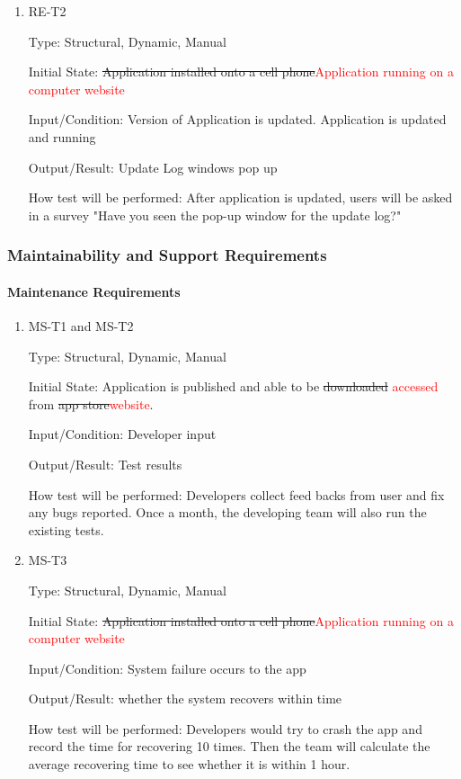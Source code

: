 \documentclass[12pt, titlepage]{article}
\begin{document}
\begin{enumerate}
					
\item{RE-T2\\}

Type: Structural, Dynamic, Manual
					
Initial State: \sout{Application installed onto a cell phone}\textcolor{red}{Application running on a computer website}
					
Input/Condition: Version of Application is updated. Application is updated and running
					
Output/Result: Update Log windows pop up
					
How test will be performed: After application is updated, users will be asked in a survey "Have you seen the pop-up window for the update log?" 

\end{enumerate}

\subsubsection{Maintainability and Support Requirements}
\paragraph{Maintenance Requirements}
\begin{enumerate}

\item{MS-T1 and MS-T2\\}

Type: Structural, Dynamic, Manual
					
Initial State: Application is published and able to be \sout{downloaded} \textcolor{red}{accessed} from \sout{app store}\textcolor{red}{website}.
					
Input/Condition: Developer input
					
Output/Result: Test results
					
How test will be performed: Developers collect feed backs from user and fix any bugs reported. Once a month, the developing team will also run the existing tests.
\item{MS-T3\\}

Type: Structural, Dynamic, Manual
					
Initial State: \sout{Application installed onto a cell phone}\textcolor{red}{Application running on a computer website}
					
Input/Condition: System failure occurs to the app
					
Output/Result: whether the system recovers within time
					
How test will be performed: Developers would try to crash the app and record the time for recovering 10 times. Then the team will calculate the average recovering time to see whether it is within 1 hour.
\end{enumerate}
\end{document}

